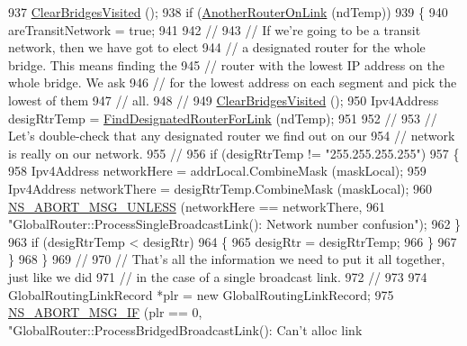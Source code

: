 \begin{DoxyCode}
937       \hyperlink{classns3_1_1GlobalRouter_a2519d9ebeb7425ffe4569c6ed0eaf4cf}{ClearBridgesVisited} ();
938       \textcolor{keywordflow}{if} (\hyperlink{classns3_1_1GlobalRouter_ae2af74f394b3b8de4daad7000fb0b9f7}{AnotherRouterOnLink} (ndTemp))
939         \{
940           areTransitNetwork = \textcolor{keyword}{true};
941 
942           \textcolor{comment}{//}
943           \textcolor{comment}{// If we're going to be a transit network, then we have got to elect}
944           \textcolor{comment}{// a designated router for the whole bridge.  This means finding the}
945           \textcolor{comment}{// router with the lowest IP address on the whole bridge.  We ask }
946           \textcolor{comment}{// for the lowest address on each segment and pick the lowest of them}
947           \textcolor{comment}{// all.}
948           \textcolor{comment}{//}
949           \hyperlink{classns3_1_1GlobalRouter_a2519d9ebeb7425ffe4569c6ed0eaf4cf}{ClearBridgesVisited} ();
950           Ipv4Address desigRtrTemp = \hyperlink{classns3_1_1GlobalRouter_ab562e4407394674ef8502b3ab1d051d6}{FindDesignatedRouterForLink} (ndTemp);
951 
952           \textcolor{comment}{//}
953           \textcolor{comment}{// Let's double-check that any designated router we find out on our}
954           \textcolor{comment}{// network is really on our network.}
955           \textcolor{comment}{//}
956           \textcolor{keywordflow}{if} (desigRtrTemp != \textcolor{stringliteral}{"255.255.255.255"})
957             \{
958               Ipv4Address networkHere = addrLocal.CombineMask (maskLocal);
959               Ipv4Address networkThere = desigRtrTemp.CombineMask (maskLocal);
960               \hyperlink{group__fatal_ga0bd3f62c55e7347ff814572f3aaa3864}{NS\_ABORT\_MSG\_UNLESS} (networkHere == networkThere, 
961                                    \textcolor{stringliteral}{"GlobalRouter::ProcessSingleBroadcastLink(): Network number confusion"});
962             \}
963           \textcolor{keywordflow}{if} (desigRtrTemp < desigRtr)
964             \{
965               desigRtr = desigRtrTemp;
966             \}
967         \}
968     \}
969   \textcolor{comment}{//}
970   \textcolor{comment}{// That's all the information we need to put it all together, just like we did}
971   \textcolor{comment}{// in the case of a single broadcast link.}
972   \textcolor{comment}{//}
973 
974   GlobalRoutingLinkRecord *plr = \textcolor{keyword}{new} GlobalRoutingLinkRecord;
975   \hyperlink{group__fatal_ga6653324225bc139e46deea177614ceee}{NS\_ABORT\_MSG\_IF} (plr == 0, \textcolor{stringliteral}{"GlobalRouter::ProcessBridgedBroadcastLink(): Can't alloc link
}
\end{DoxyCode}
